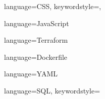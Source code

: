  {
  language=CSS,
  keywordstyle=\color{lightblack},
}

 {
  language=JavaScript
}

 {
  language=Terraform
}

 {
  language=Dockerfile
}

 {
  language=YAML
}

 {
  language=SQL,
  keywordstyle=\color{azure}
}

